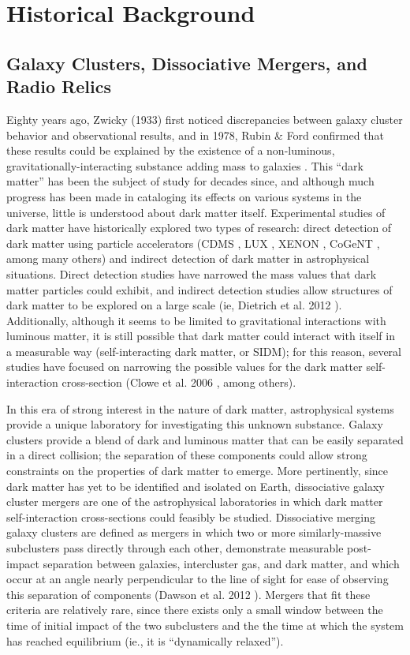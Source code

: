 \documentclass[12 pt]{article}
\begin{document}
\newpage
\section{Historical Background}
\subsection{Galaxy Clusters, Dissociative Mergers, and Radio Relics}

Eighty years ago, Zwicky (1933) \cite{Zwicky33} first noticed discrepancies between galaxy cluster behavior and observational results, and in 1978, Rubin \& Ford confirmed that these results could be explained by the existence of a non-luminous, gravitationally-interacting substance adding mass to galaxies \cite{Rubin78}. This “dark matter” has been the subject of study for decades since, and although much progress has been made in cataloging its effects on various systems in the universe, little is understood about dark matter itself. Experimental studies of dark matter have historically explored two types of research: direct detection of dark matter using particle accelerators (CDMS \cite{CDMS}, LUX \cite{LUX}, XENON \cite{XENON}, CoGeNT \cite{cogent}, among many others) and indirect detection of dark matter in astrophysical situations. Direct detection studies have narrowed the mass values that dark matter particles could exhibit, and indirect detection studies allow structures of dark matter to be explored on a large scale (ie, Dietrich et al. 2012 \cite{Dietrich12}). Additionally, although it seems to be limited to gravitational interactions with luminous matter, it is still possible that dark matter could interact with itself in a measurable way (self-interacting dark matter, or SIDM); for this reason, several studies have focused on narrowing the possible values for the dark matter self-interaction cross-section (Clowe et al. 2006 \cite{Clowe06}, among others).

In this era of strong interest in the nature of dark matter, astrophysical systems provide a unique laboratory for investigating this unknown substance. Galaxy clusters provide a blend of dark and luminous matter that can be easily separated in a direct collision; the separation of these components could allow strong constraints on the properties of dark matter to emerge. More pertinently, since dark matter has yet to be identified and isolated on Earth, dissociative galaxy cluster mergers are one of the astrophysical laboratories in which dark matter self-interaction cross-sections could feasibly be studied. Dissociative merging galaxy clusters are defined as mergers in which two or more similarly-massive subclusters pass directly through each other, demonstrate measurable post-impact separation between galaxies, intercluster gas, and dark matter, and which occur at an angle nearly perpendicular to the line of sight for ease of observing this separation of components (Dawson et al. 2012 \cite{Dawson12}). Mergers that fit these criteria are relatively rare, since there exists only a small window between the time of initial impact of the two subclusters and the the time at which the system has reached equilibrium (ie., it is “dynamically relaxed”). 
\end{document}

